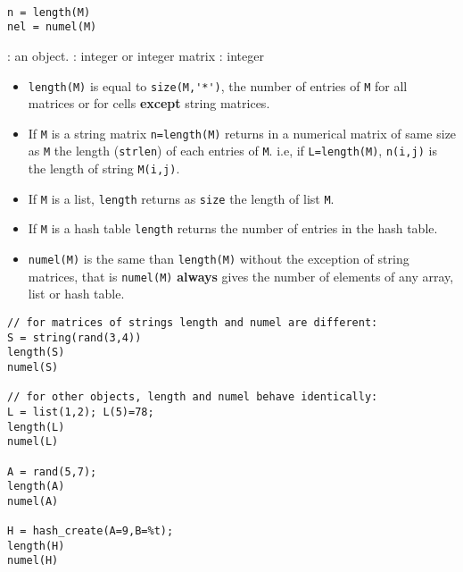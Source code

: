 
\begin{mandesc}
   \\
\end{mandesc}
\begin{calling_sequence}
\begin{verbatim}
n = length(M)   
nel = numel(M)   
\end{verbatim}
\end{calling_sequence}

\begin{parameters}
  \begin{varlist}
    : an object.
    : integer or integer matrix
    : integer
  \end{varlist}
\end{parameters}

\begin{mandescription}
\begin{itemize}
  \item \verb!length(M)! is equal to \verb!size(M,'*')!, the number of entries of \verb!M! for all matrices 
    or for cells {\bf except} string matrices.
  \item If \verb+M+ is a string matrix \verb+n=length(M)+ returns in a  numerical matrix of same size 
    as \verb+M+ the length (\verb+strlen+) of each entries of \verb+M+. i.e, if \verb+L=length(M)+, 
    \verb+n(i,j)+ is the length of string \verb+M(i,j)+.
  \item If \verb+M+ is a list, \verb+length+ returns as \verb+size+ the length of list \verb+M+.
  \item If \verb+M+ is a hash table \verb+length+ returns the number of entries in the hash table.
  \item \verb!numel(M)! is the same than \verb!length(M)! without the exception of string matrices, that
        is \verb!numel(M)! {\bf always} gives the number of elements of any array, list or hash table.
\end{itemize}
\end{mandescription}

\begin{examples}
\begin{Verbatim}
// for matrices of strings length and numel are different: 
S = string(rand(3,4))
length(S)
numel(S)

// for other objects, length and numel behave identically:
L = list(1,2); L(5)=78; 
length(L)
numel(L)

A = rand(5,7);
length(A)
numel(A)
    
H = hash_create(A=9,B=%t);
length(H)
numel(H)
\end{Verbatim}
\end{examples}

\begin{manseealso}
\end{manseealso}

